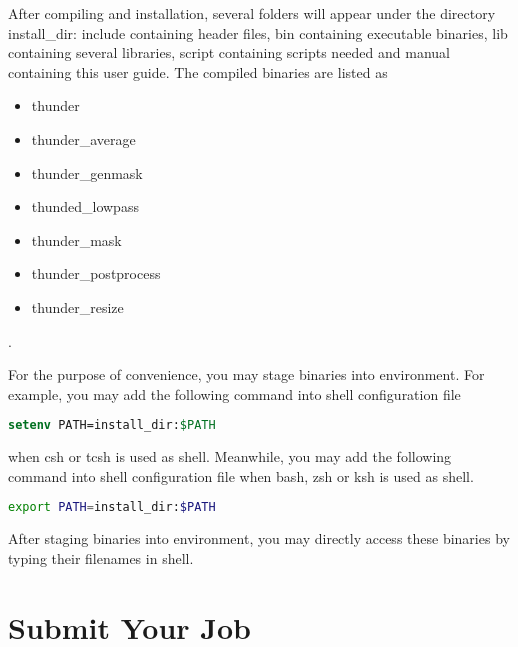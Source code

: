 \documentclass{article}
\begin{document}
                After compiling and installation, several folders will appear under the directory \textsf{install\_dir}: \textsf{include} containing header files, \textsf{bin} containing executable binaries, \textsf{lib} containing several libraries, \textsf{script} containing scripts needed and \textsf{manual} containing this user guide. The compiled binaries are listed as
                \begin{itemize}
                    \item \textsf{thunder}
                    \item \textsf{thunder\_average}
                    \item \textsf{thunder\_genmask}
                    \item \textsf{thunded\_lowpass}
                    \item \textsf{thunder\_mask}
                    \item \textsf{thunder\_postprocess}
                    \item \textsf{thunder\_resize}
                \end{itemize}.
                
                For the purpose of convenience, you may stage binaries into environment. For example, you may add the following command into shell configuration file
                
                \begin{lstlisting}[language={csh}]
setenv PATH=install_dir:$PATH
                \end{lstlisting}
                
                when \textsf{csh} or \textsf{tcsh} is used as shell. Meanwhile, you may add the following command into shell configuration file when \textsf{bash}, \textsf{zsh} or \textsf{ksh} is used as shell.
                
                \begin{lstlisting}[language={bash}]
export PATH=install_dir:$PATH
                \end{lstlisting}
                
                After staging binaries into environment, you may directly access these binaries by typing their filenames in shell.
                
    \section{Submit Your Job}
    
\end{document}
